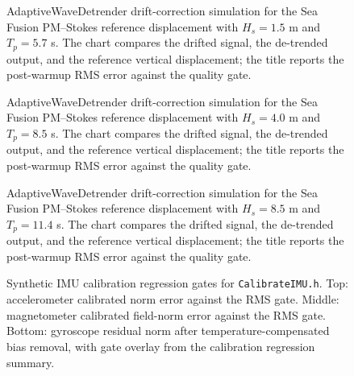 \documentclass[11pt,letterpaper]{article}
\begin{document}
\begin{figure}[H]\centering
  \resizebox{\textwidth}{!}{}
  \caption{AdaptiveWaveDetrender drift-correction simulation for the Sea Fusion PM--Stokes reference displacement with $H_s = 1.5$ m and $T_p = 5.7$ s. The chart compares the drifted signal, the de-trended output, and the reference vertical displacement; the title reports the post-warmup RMS error against the quality gate.}
  \label{fig:adaptive_wave_detrender_sim_medium}
\end{figure}

\begin{figure}[H]\centering
  \resizebox{\textwidth}{!}{}
  \caption{AdaptiveWaveDetrender drift-correction simulation for the Sea Fusion PM--Stokes reference displacement with $H_s = 4.0$ m and $T_p = 8.5$ s. The chart compares the drifted signal, the de-trended output, and the reference vertical displacement; the title reports the post-warmup RMS error against the quality gate.}
  \label{fig:adaptive_wave_detrender_sim_large}
\end{figure}

\begin{figure}[H]\centering
  \resizebox{\textwidth}{!}{}
  \caption{AdaptiveWaveDetrender drift-correction simulation for the Sea Fusion PM--Stokes reference displacement with $H_s = 8.5$ m and $T_p = 11.4$ s. The chart compares the drifted signal, the de-trended output, and the reference vertical displacement; the title reports the post-warmup RMS error against the quality gate.}
  \label{fig:adaptive_wave_detrender_sim_extreme}
\end{figure}


\begin{figure}[H]\centering
  \resizebox{\textwidth}{!}{}
  \caption{Synthetic IMU calibration regression gates for \texttt{CalibrateIMU.h}. Top: accelerometer calibrated norm error against the RMS gate. Middle: magnetometer calibrated field-norm error against the RMS gate. Bottom: gyroscope residual norm after temperature-compensated bias removal, with gate overlay from the calibration regression summary.}
  \label{fig:calibrate_imu_quality}
\end{figure}

\end{document}
